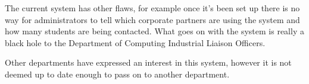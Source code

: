 The current system has other flaws, for example once it's been set up there is no way for administrators to tell which corporate partners are using the system and how many students are being contacted. What goes on with the system is really a black hole to the Department of Computing Industrial Liaison Officers. 

Other departments have expressed an interest in this system, however it is not deemed up to date enough to pass on to another department.